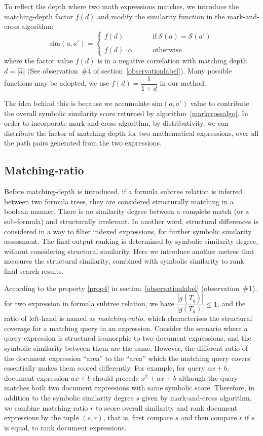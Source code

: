 To reflect the depth where two math expressions matches, we introduce the matching-depth factor $f(d)$ and modify the similarity function in the mark-and-cross algorithm:
$$
\mathrm{sim}(a,a') = 
\left\{
\begin{array}{ll}
f(d)   &\qquad \mathrm{if}\  \mathcal{S}(a) = \mathcal{S}(a')
\\
\\
f(d) \cdot \alpha  &\qquad \mathrm{otherwise}
\end{array}
\right.
$$
where the factor value $f(d)$ is in a negative correlation with matching depth $d = |\hat{a}|$ (See observation~\#4 of section~\ref{observationlabel}). 
Many possible functions may be adopted, we use $f(d) = \dfrac{1}{1 + d}$ in our method. 

The idea behind this is because we accumulate $\mathrm{sim}(a,a')$ value to contribute the overall symbolic similarity score returned by algorithm~\ref{markcrossalgo}. In order to incorporate mark-and-cross algorithm, by distributivity, we can distribute the factor of matching depth for two mathematical expressions, over all the path pairs generated from the two expressions. 

\subsection{Matching-ratio}
Before matching-depth is introduced, if a formula subtree relation is inferred between two formula trees, they are considered structurally matching in a boolean manner. 
There is no similarity degree between a complete match (or a sub-formula) and structurally irrelevant. 
In another word, structural differences is considered in a way to filter indexed expressions, for further symbolic similarity assessment. 
The final output ranking is determined by symbolic similarity degree, without considering structural similarity. 
Here we introduce another metres that measures the structural similarity, combined with symbolic similarity to rank final search results.

According to the property \ref{prop4} in section~\ref{observationlabel} (observation~\#1), for two expression in formula subtree relation, we have $\dfrac{|g(T_q)|}{|g(T_d)|} \le 1$, and the ratio of left-hand is named as \textit{matching-ratio}, which characterises the structural coverage for a matching query in an expression.
Consider the scenario where a query expression is structural isomorphic to two document expressions, and the symbolic similarity between them are the same. 
However, the different ratio of the document expression ``area'' to the ``area'' which the matching query covers essentially makes them scored differently.
For example, for query $ax + b$, document expression $ax + b$ should precede $x^2 + ax + b$ although the query matches both two document expressions with same symbolic score.
Therefore, in addition to the symbolic similarity degree $s$ given by mark-and-cross algorithm, we combine matching-ratio $r$ to score overall similarity and rank document expressions by the tuple $(s, r)$, that is, first compare $s$ and then compare $r$ if $s$ is equal, to rank document expressions.

